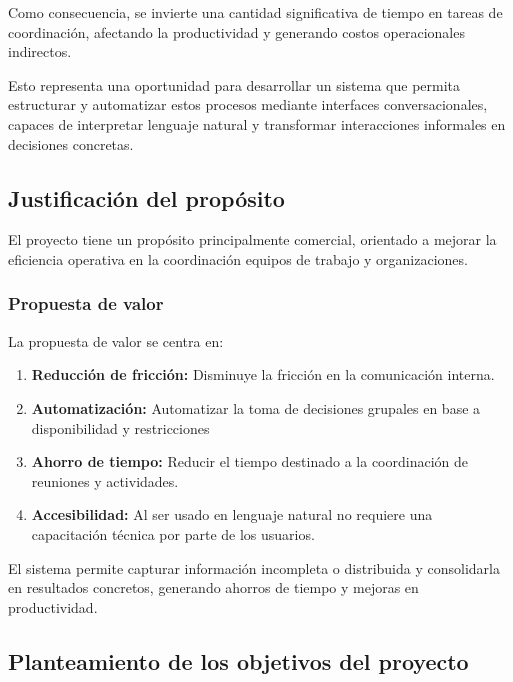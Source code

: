 Como consecuencia, se invierte una cantidad significativa de tiempo en tareas de coordinación, afectando la productividad y generando costos operacionales indirectos.


Esto representa una oportunidad para desarrollar un sistema que permita estructurar y automatizar estos procesos mediante interfaces conversacionales, capaces de interpretar lenguaje natural y transformar interacciones informales en decisiones concretas.

\subsection{Justificación del propósito}

El proyecto tiene un propósito principalmente comercial, orientado a mejorar la eficiencia operativa en la coordinación equipos de trabajo y organizaciones.

\subsubsection{Propuesta de valor}

La propuesta de valor se centra en:

\begin{enumerate}
    \item \textbf{Reducción de fricción:} Disminuye la fricción en la comunicación interna.
    
    \item \textbf{Automatización:} Automatizar la toma de decisiones grupales en base a disponibilidad y restricciones
    
    \item \textbf{Ahorro de tiempo:} Reducir el tiempo destinado a la coordinación de reuniones y actividades.
    
    \item \textbf{Accesibilidad:} Al ser usado en lenguaje natural no requiere una capacitación técnica por parte de los usuarios.
\end{enumerate}

El sistema permite capturar información incompleta o distribuida y consolidarla en resultados concretos, generando ahorros de tiempo y mejoras en productividad.


\subsection{Planteamiento de los objetivos del proyecto}

